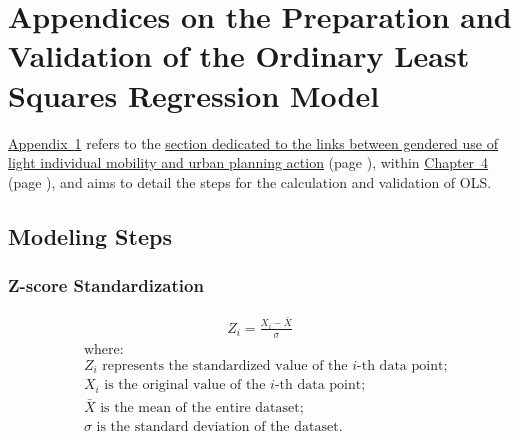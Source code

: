     \setcounter{section}{0}
\chapter{Appendices on the Preparation and Validation of the Ordinary Least Squares Regression Model}
    \label{annexes:methodologie-ols-cyclabilite-genre}

\hyperref[annexes:methodologie-ols-cyclabilite-genre]{Appendix~\ref{annexes:methodologie-ols-cyclabilite-genre}} refers to the \hyperref[section-chap4:cyclabilite-genre]{section dedicated to the links between gendered use of light individual mobility and urban planning action} (page \pageref{section-chap4:cyclabilite-genre}), within \hyperref[chap4:titre]{Chapter~4} (page \pageref{chap4:titre}), and aims to detail the steps for the calculation and validation of \acrfull{OLS}.%

    \setcounter{tocdepth}{2}
    \renewcommand{\localcontentsname}{Structure of Appendix~\ref{annexes:methodologie-ols-cyclabilite-genre}}
\localtableofcontents

    \newpage
    \newpage
\section{Modeling Steps}
    \label{annexes:methodologie-ols-etapes}

\subsection{Z-score Standardization}
    \label{annexes:methodologie-ols-z-score}

    \begin{equation}
    \label{annexes:equation:z-score}
    \begin{aligned}
Z_i = \frac{X_i - \bar{X}}{\sigma}
    \end{aligned}
    \end{equation}
\begin{align*}
    &\text{where:} \\
    &Z_i \text{ represents the standardized value of the } i\text{-th data point;} \\
    &X_i \text{ is the original value of the } i\text{-th data point;} \\
    &\bar{X} \text{ is the mean of the entire dataset;} \\
    &\sigma \text{ is the standard deviation of the dataset.}
\end{align*}

